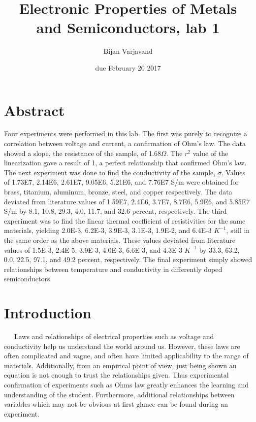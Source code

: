 \documentclass[11pt]{article}
\title{Electronic Properties of Metals and Semiconductors, lab 1}
\author{Bijan Varjavand}
\date{due February 20 2017}
\begin{document}
\maketitle
\vspace{3.5in}
\section*{Abstract}
Four experiments were performed in this lab. The first was purely to recognize a correlation between voltage and current, a confirmation of Ohm's law. The data showed a slope, the resistance of the sample, of 1.68$\Omega$. The $r^2$ value of the linearization gave a result of 1, a perfect relationship that confirmed Ohm's law. The next experiment was done to find the conductivity of the sample, $\sigma$. Values of 1.73E7, 2.14E6, 2.61E7, 9.05E6, 5.21E6, and 7.76E7 S/m were obtained for brass, titanium, aluminum, bronze, steel, and copper respectively. The data deviated from literature values of 1.59E7, 2.4E6, 3.7E7, 8.7E6, 5.9E6, and 5.85E7 S/m by 8.1, 10.8, 29.3, 4.0, 11.7, and 32.6 percent, respectively. The third experiment was to find the linear thermal coefficient of resistivities for the same materials, yielding 2.0E-3, 6.2E-3, 3.9E-3, 3.1E-3, 1.9E-2, and 6.4E-3 $K^{-1}$, still in the same order as the above materials. These values deviated from literature values of 1.5E-3, 2.4E-5, 3.9E-3, 4.0E-3, 6.6E-3, and 4.3E-3 $K^{-1}$ by 33.3, 63.2, 0.0, 22.5, 97.1, and 49.2 percent, respectively. The final experiment simply showed relationships between temperature and conductivity in differently doped semiconductors.

\clearpage
\onehalfspacing
\section*{Introduction}
\ \ \ Laws and relationships of electrical properties such as voltage and conductivity help us understand the world around us. However, these laws are often complicated and vague, and often have limited applicability to the range of materials. Additionally, from an empirical point of view, just being shown an equation is not enough to trust the relationships given. Thus experimental confirmation of experiments such as Ohms law greatly enhances the learning and understanding of the student. Furthermore, additional relationships between variables which may not be obvious at first glance can be found during an experiment.\\
\end{document}
